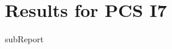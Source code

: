 \renewcommand{\DTRPcs}{I7} %
\renewcommand{\DTRPcsLong}{I7}


    \section{Results for PCS \DTRPcsLong}

    {{subReport}}
    \newpage

